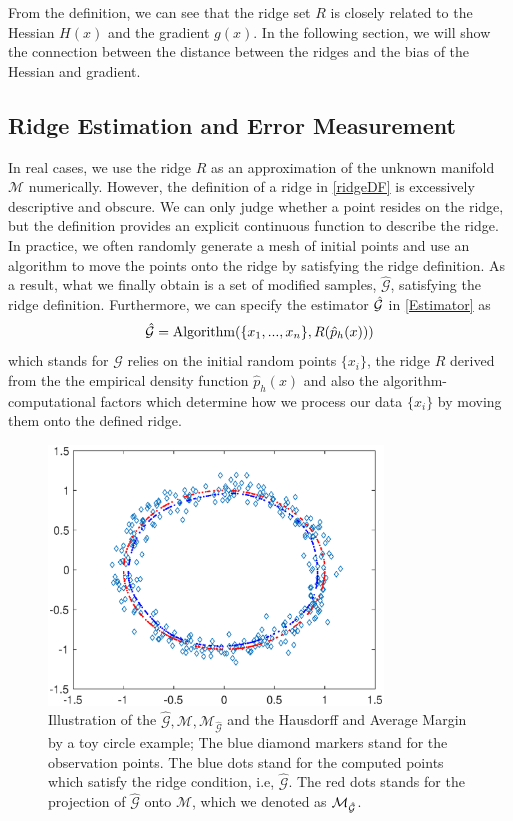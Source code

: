 \documentclass[aos,preprint]{imsart}
\theoremstyle{remark}
\begin{document}
From the definition, we can see that the ridge set $R$ is closely related to the Hessian $H(x)$ and the gradient $g(x)$. In the following section, we will show the connection between the distance between the ridges and the bias of the Hessian and gradient. 



\subsection{Ridge Estimation and Error Measurement}
In real cases, we use the ridge $R$ as an approximation of the unknown manifold $\mathcal M$ numerically. However, the definition of a ridge in \eqref{ridgeDF} is excessively descriptive and obscure. We can only judge whether a point resides on the ridge, but the definition provides an explicit continuous function to describe the ridge. In practice, we often randomly generate a mesh of initial points and use an algorithm to move the points onto the ridge by satisfying the ridge definition. As a result, what we finally obtain is a set of modified samples, $\hat{\mathcal G}$, satisfying the ridge definition. Furthermore, we can specify the estimator $\hat{\cal G}$ in \eqref{Estimator} as
\[
\hat{\mathcal G} = {\rm Algorithm}(\{x_1,...,x_n\},  R(\hat{p}_h(x)))
\]
which stands for $\hat{\mathcal G}$ relies on the initial random points $\{x_i\}$, the ridge $R$ derived from the the empirical density function $\hat{p}_h(x)$ and also the algorithm-computational factors which determine how we process our data $\{x_i\}$ by moving them onto the defined ridge.
\begin{figure}[htbp] %
   \centering
   \includegraphics[width=3.5in]{introduction_demo.eps} 
   \caption{Illustration of the $\hat{\mathcal G},\mathcal M, \mathcal M_{\hat{\mathcal G}}$ and the Hausdorff and Average Margin by a toy circle example; The blue diamond markers stand for the observation points. The blue dots stand for the computed points which satisfy the ridge condition, i.e, $\hat{\mathcal G}$. The red dots stands for the projection of $\hat{\mathcal G}$ onto $\mathcal M$, which we denoted as $\cal M_{\hat{G}}$.  }
   \label{fig:example}
\end{figure}
\end{document}
